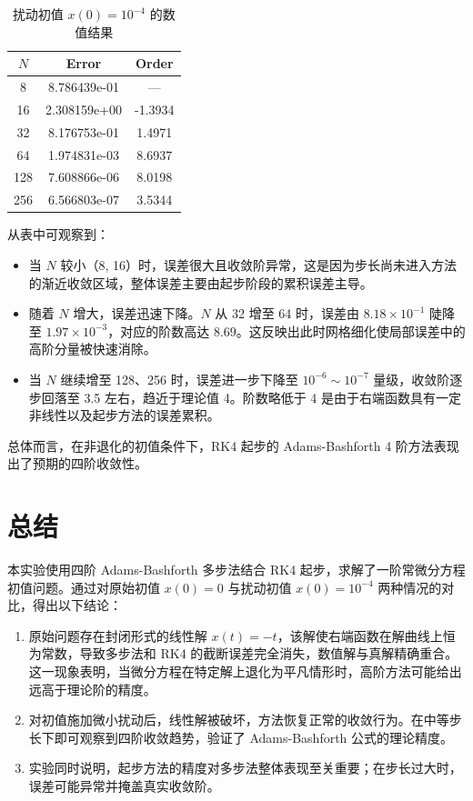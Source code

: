 \documentclass[12pt,a4paper]{article}
\begin{document}
\begin{table}[htbp]
    \centering
    \caption{扰动初值 $x(0)=10^{-4}$ 的数值结果}
    \label{tab:res2}
    \begin{tabular}{ccc}
        \toprule
        $N$ & Error & Order \\
        \midrule
        8   & 8.786439e-01 & ---      \\
        16  & 2.308159e+00 & -1.3934  \\
        32  & 8.176753e-01 & 1.4971   \\
        64  & 1.974831e-03 & 8.6937   \\
        128 & 7.608866e-06 & 8.0198   \\
        256 & 6.566803e-07 & 3.5344   \\
        \bottomrule
    \end{tabular}
\end{table}

从表中可观察到：
\begin{itemize}
    \item 当 $N$ 较小（8, 16）时，误差很大且收敛阶异常，这是因为步长尚未进入方法的渐近收敛区域，整体误差主要由起步阶段的累积误差主导。
    \item 随着 $N$ 增大，误差迅速下降。$N$ 从 32 增至 64 时，误差由 $8.18\times10^{-1}$ 陡降至 $1.97\times10^{-3}$，对应的阶数高达 $8.69$。这反映出此时网格细化使局部误差中的高阶分量被快速消除。
    \item 当 $N$ 继续增至 128、256 时，误差进一步下降至 $10^{-6}\sim 10^{-7}$ 量级，收敛阶逐步回落至 3.5 左右，趋近于理论值 4。阶数略低于 4 是由于右端函数具有一定非线性以及起步方法的误差累积。
\end{itemize}

总体而言，在非退化的初值条件下，RK4 起步的 Adams-Bashforth 4 阶方法表现出了预期的四阶收敛性。

\section{总结}

本实验使用四阶 Adams-Bashforth 多步法结合 RK4 起步，求解了一阶常微分方程初值问题。通过对原始初值 $x(0)=0$ 与扰动初值 $x(0)=10^{-4}$ 两种情况的对比，得出以下结论：
\begin{enumerate}
    \item 原始问题存在封闭形式的线性解 $x(t) = -t$，该解使右端函数在解曲线上恒为常数，导致多步法和 RK4 的截断误差完全消失，数值解与真解精确重合。这一现象表明，当微分方程在特定解上退化为平凡情形时，高阶方法可能给出远高于理论阶的精度。
    \item 对初值施加微小扰动后，线性解被破坏，方法恢复正常的收敛行为。在中等步长下即可观察到四阶收敛趋势，验证了 Adams-Bashforth 公式的理论精度。
    \item 实验同时说明，起步方法的精度对多步法整体表现至关重要；在步长过大时，误差可能异常并掩盖真实收敛阶。
\end{enumerate}
\end{document}
